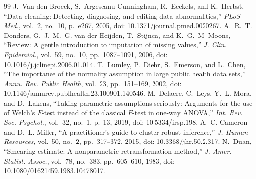 \documentclass[10pt,a4paper]{article}
\renewcommand{\refname}{Tài liệu tham khảo}%
\begin{document}
\clearpage
\renewcommand{\refname}{Tài liệu tham khảo}
\begin{thebibliography}{99}
   J.~Van den Broeck, S.~Argeseanu Cunningham, R.~Eeckels, and
    K.~Herbst, ``Data cleaning: Detecting, diagnosing, and editing data abnormalities,''
    \emph{PLoS Med.}, vol.~2, no.~10, p.~e267, 2005, doi: 10.1371/journal.pmed.0020267.
   A.~R.~T. Donders, G.~J.~M.~G. van der Heijden, T.~Stijnen, and
    K.~G.~M. Moons, ``Review: A gentle introduction to imputation of missing values,''
    \emph{J. Clin. Epidemiol.}, vol.~59, no.~10, pp.~1087--1091, 2006,
    doi: 10.1016/j.jclinepi.2006.01.014.
   T.~Lumley, P.~Diehr, S.~Emerson, and L.~Chen, ``The importance of
    the normality assumption in large public health data sets,'' \emph{Annu. Rev. Public
    Health}, vol.~23, pp.~151--169, 2002, doi: 10.1146/annurev.publhealth.23.100901.140546.
   M.~Delacre, C.~Leys, Y.~L. Mora, and D.~Lakens, ``Taking parametric
    assumptions seriously: Arguments for the use of Welch's $F$-test instead of the classical
    $F$-test in one-way ANOVA,'' \emph{Int. Rev. Soc. Psychol.}, vol.~32, no.~1, p.~13, 2019,
    doi: 10.5334/irsp.198.
   A.~C. Cameron and D.~L. Miller, ``A practitioner's guide to
    cluster-robust inference,'' \emph{J. Human Resources}, vol.~50, no.~2, pp.~317--372,
    2015, doi: 10.3368/jhr.50.2.317.
   N.~Duan, ``Smearing estimate: A nonparametric retransformation
    method,'' \emph{J. Amer. Statist. Assoc.}, vol.~78, no.~383, pp.~605--610, 1983,
    doi: 10.1080/01621459.1983.10478017.


\end{thebibliography}
\end{document}
